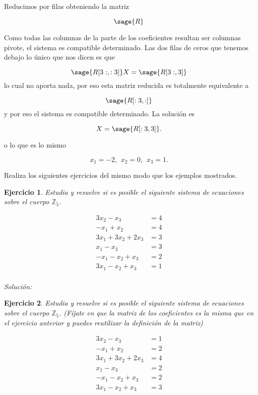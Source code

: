 \documentclass{amsart}
\newtheorem{ejer}{Ejercicio}
\begin{document}
Reducimos por filas obteniendo la matriz

\[ \sage{R} \]

Como todas las columnas de la parte de los coeficientes resultan ser columnas pivote, 
el sistema es compatible determinado. Las dos filas de ceros que tenemos 
debajo lo único que nos dicen es que 

\[ \sage{R[3:,:3]} X = \sage{R[3:,3]}\]
lo cual no aporta nada, por eso esta matriz reducida es totalmente equivalente a 

\[ \sage{R[:3,:]} \] y por eso el sistema es compatible determinado. 
La solución es

\[ X = \sage{R[:3,3]}. \]

o lo que es lo mismo

\[ x_1 = -2, \ \ x_2 = 0,  \ \ x_3 = 1.\]


Realiza los siguientes ejercicios del mismo modo que los ejemplos
mostrados.

\begin{ejer}
Estudia y resuelve si es posible el siguiente sistema de ecuaciones 
sobre el cuerpo ${\mathbb Z}_5$.

\begin{align*}
3 x_{2} - x_{3} &= 4\\
-x_{1} + x_{2} &= 4\\
3 x_{1} + 3 x_{2} + 2 x_{3} &= 3\\
x_{1} - x_{3} &= 3\\
-x_{1} - x_{2} + x_{3} &= 2\\
3 x_{1} - x_{2} + x_{3} &= 1 \\
\end{align*}
\end{ejer}

{\it Soluci\'on:}


\begin{ejer}
Estudia y resuelve si es posible el siguiente sistema de ecuaciones 
sobre el cuerpo ${\mathbb Z}_5$. (Fíjate en que la matriz de los coeficientes
es la misma que en el ejercicio anterior y puedes reutilizar la definición
de la matriz)

\begin{align*}
3 x_{2} - x_{3} &= 1\\
-x_{1} + x_{2} &= 2\\
3 x_{1} + 3 x_{2} + 2 x_{3} &= 4\\
x_{1} - x_{3} &= 2\\
-x_{1} - x_{2} + x_{3} &= 2\\
3 x_{1} - x_{2} + x_{3} &= 3 \\
\end{align*}
\end{ejer}
\end{document}
